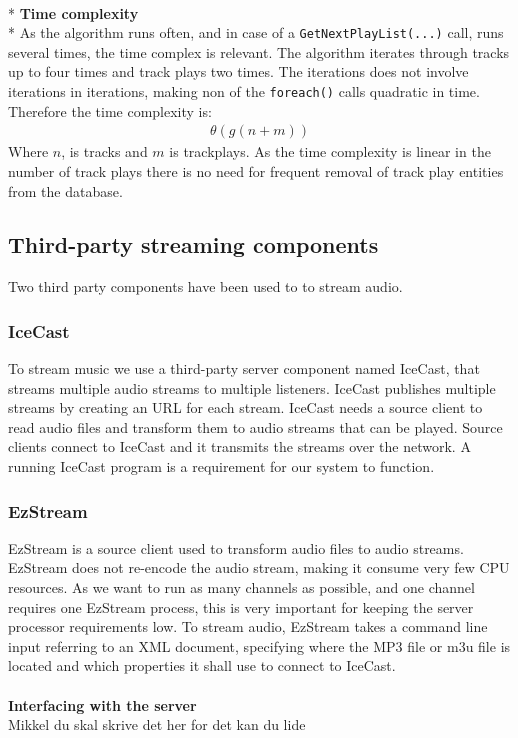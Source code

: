 \documentclass[a4paper,11pt,report]{article}
\begin{document}
\textbf{ } \\*
\textbf{Time complexity} \\*
As the algorithm runs often, and in case of a \texttt{GetNextPlayList(...)} call, runs several times, the time complex is relevant. The algorithm iterates through tracks up to four times and track plays two times. The iterations does not involve iterations in iterations, making non of the \texttt{foreach()} calls quadratic in time. Therefore the time complexity is: 
\begin{align*}
\theta (g(n + m))
\end{align*}
Where \begin{math}n\end{math}, is tracks and \begin{math}m\end{math} is trackplays. As the time complexity is linear in the number of track plays there is no need for frequent removal of track play entities from the database.

\subsection{Third-party streaming components}
Two third party components have been used to to stream audio.
\subsubsection{IceCast}
To stream music we use a third-party server component named IceCast\cite{IceCast}, that streams multiple audio streams to multiple listeners. IceCast publishes multiple streams by creating an URL for each stream. IceCast needs a source client to read audio files and transform them to audio streams that can be played. Source clients connect to IceCast and it transmits the streams over the network. A running IceCast program is a requirement for our system to function.
\subsubsection{EzStream}
EzStream\cite{EzStream} is a source client used to transform audio files to audio streams. EzStream does not re-encode the audio stream, making it consume very few CPU resources. As we want to run as many channels as possible, and one channel requires one EzStream process, this is very important for keeping the server processor requirements low. To stream audio, EzStream takes a command line input referring to an XML document, specifying where the MP3 file or m3u file is located and which properties it shall use to connect to IceCast. \\ \\
\textbf{Interfacing with the server} \\
Mikkel du skal skrive det her for det kan du lide
\end{document}

